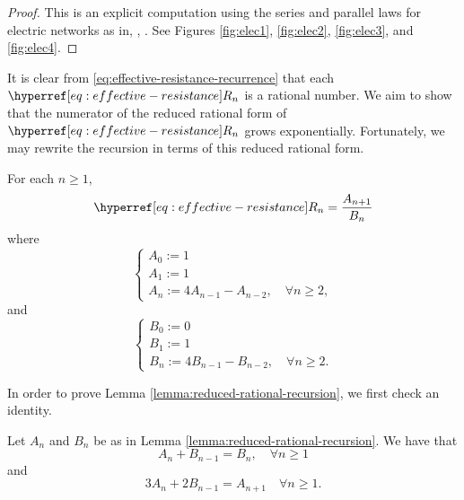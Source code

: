 \documentclass[12pt]{amsart}
\numberwithin{equation}{section}
\begin{document}
	
	
	\begin{proof}
		This is an explicit computation using the series and parallel laws for electric networks as in, \eg, \cite[Section 2.3]{lyons-peres-book}. See Figures \ref{fig:elec1}, \ref{fig:elec2}, \ref{fig:elec3}, and \ref{fig:elec4}.
	\end{proof}
	
	It is clear from \eqref{eq:effective-resistance-recurrence} that each $\Rn{n}$ is a rational number. We aim to show that the 
	numerator of the reduced rational form of $\Rn{n}$ grows exponentially. Fortunately, we may rewrite the recursion in terms of this reduced rational form.
	\begin{lemma} \label{lemma:reduced-rational-recursion}
		For each $n \geq 1$, 
		\begin{equation} \label{eq:rec-form}
			\Rn{n} = \frac{A_{n+1}}{B_n}
		\end{equation}
		where
		\begin{equation} \label{eq:A-recursion}
			\begin{cases}
				A_0 := 1 \\
				A_1 := 1 \\
				A_{n} := 4 A_{n-1} - A_{n-2}, \quad \forall n \geq 2,
			\end{cases}
		\end{equation}
		and
		\begin{equation} \label{eq:B-recursion}
			\begin{cases}
				B_0 := 0 \\
				B_1 := 1 \\
				B_{n} := 4 B_{n-1} - B_{n-2}, \quad \forall n \geq 2.
			\end{cases}
		\end{equation}
	\end{lemma}
	In order to prove Lemma \ref{lemma:reduced-rational-recursion}, we first check an identity. 
	\begin{lemma} \label{lemma:num-denom-recs}
		Let $A_n$ and $B_n$ be as in Lemma \ref{lemma:reduced-rational-recursion}. 
		We have that
		\begin{equation} \label{eq:rec-form-1}
			A_n + B_{n-1} = B_{n}, \quad \forall n \geq 1
		\end{equation}
		and
		\begin{equation} \label{eq:rec-form-2}
			3 A_n +2  B_{n-1} = A_{n+1}  \quad \forall n \geq 1.
		\end{equation}
		
	\end{lemma}
	
\end{document}
